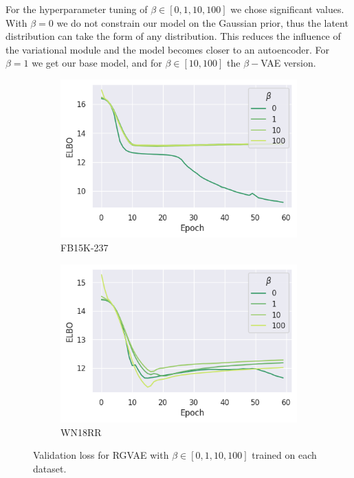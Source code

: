 
For the hyperparameter tuning of $\beta \in [0,1,10,100]$ we chose significant values. With $\beta = 0$ we do not constrain our model on the Gaussian prior, thus the latent distribution can take the form of any distribution. This reduces the influence of the variational module and the model becomes closer to an autoencoder. For $\beta = 1$ we get our base model, and for $\beta \in [10,100]$ the $\beta-$VAE version.


\begin{figure}[H]
    \centering
    \begin{subfigure}{.5\textwidth}
      \centering
      \includegraphics[width=.9\linewidth, keepaspectratio]{graphs/plots/beta_loss_fb.png}
      \caption{FB15K-237}
      \label{fig5:betafb}
    \end{subfigure}%
    \begin{subfigure}{.5\textwidth}
      \centering
      \includegraphics[width=.9\linewidth, keepaspectratio]{graphs/plots/beta_loss_wn.png}
      \caption{WN18RR}
      \label{fig5:betawn}
    \end{subfigure}
    \caption{Validation loss for RGVAE with $\beta \in [0,1,10,100]$ trained on each dataset.}
    \label{fig5:beta}
\end{figure}


